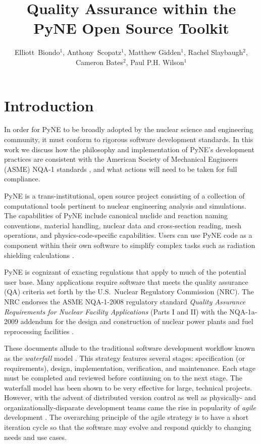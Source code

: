 \documentclass{anstrans}
\title{Quality Assurance within the PyNE Open Source Toolkit}
\author{Elliott~Biondo$^{1}$, Anthony~Scopatz$^{1}$, Matthew Gidden$^{1}$, Rachel Slaybaugh$^{2}$, Cameron Bates$^{2}$, Paul P.H. Wilson$^{1}$}
\institute{
\and $^{1}$ The University of Wisconsin-Madison, 1500 Engineering Drive, Madison, WI 53706\\
\and $^{2}$ The University of California, Berkeley, 2521 Hearst Ave, Berkeley, CA 94709 \\
}
\begin{document}
\section{Introduction}

In order for PyNE \cite{scopatz_pyne} to be broadly adopted by the nuclear
science and engineering community, it must conform to rigorous
software development standards. In this work we discuss how the
philosophy and implementation of PyNE's development practices are consistent
with the American Society of Mechanical Engineers (ASME) NQA-1 standards
\cite{nqa}\cite{add}, and what actions will need to be taken for full
compliance.

PyNE is a trans-institutional, open source project consisting of a collection
of computational tools pertinent to nuclear engineering analysis and
simulations. The capabilities of PyNE include canonical nuclide and reaction
naming conventions, material handling, nuclear data and cross-section reading,
mesh operations, and physics-code-specific capabilities. 
Users can use PyNE code as a component within their own software to simplify complex tasks
such as radiation shielding calculations \cite{Biondo2014}.

PyNE is cognizant of
exacting regulations that apply to much of the potential user base.  Many
applications require software that meets the quality assurance (QA) criteria
set forth by the U.S.\ Nuclear Regulatory Commission (NRC). The NRC endorses
the ASME NQA-1-2008 regulatory standard \emph{Quality Assurance Requirements
for Nuclear Facility Applications} (Parts I and II) \cite{nrc} with the
NQA-1a-2009 addendum \cite{add} for the design and construction of nuclear
power plants and fuel reprocessing facilities \cite{nrc}.

These documents allude to the traditional software development workflow known as the 
\emph{waterfall} model \cite{waterfall}. This strategy features several stages:
specification (or requirements), design, implementation, verification, and maintenance. 
Each stage must be 
completed and reviewed before continuing on to the next stage. The waterfall 
model has been shown to be very effective for large, technical projects.
However, with the advent of distributed version control as well as physically- 
and organizationally-disparate development teams came the rise in popularity
of \emph{agile} development \cite{larman2004agile}. The overarching principle 
of the agile strategy is to have a short iteration cycle so that the software
may evolve and respond quickly to changing needs and use cases.
\end{document}
